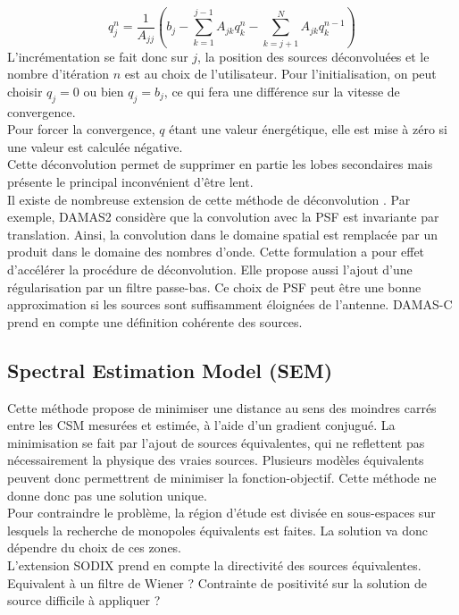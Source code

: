 \begin{equation}
	q_j^n= \frac{1}{A_{jj}}\left(b_j -\sum_{k=1}^{j-1}A_{jk}q_k^{n} - \sum_{k=j+1}^{N}A_{jk}q_k^{n-1} \right)
\end{equation}
L'incrémentation se fait donc sur $j$, la position des sources déconvoluées et le nombre d'itération $n$ est au choix de l'utilisateur. Pour l'initialisation, on peut choisir $q_j=0$ ou bien $q_j=b_j$, ce qui fera une différence sur la vitesse de convergence.\\
Pour forcer la convergence, $q$ étant une valeur énergétique, elle est mise à zéro si une valeur est calculée négative.\\
Cette déconvolution permet de supprimer en partie les lobes secondaires mais présente le principal inconvénient d'être lent.\\

Il existe de nombreuse extension de cette méthode de déconvolution \citep{Dougherty2005}. Par exemple, DAMAS2 considère que la convolution avec la PSF est invariante par translation. Ainsi, la convolution dans le domaine spatial est remplacée par un produit dans le domaine des nombres d'onde. Cette formulation a pour effet d'accélérer la procédure de déconvolution. Elle propose aussi l'ajout d'une régularisation par un filtre passe-bas. Ce choix de PSF peut être une bonne approximation si les sources sont suffisamment éloignées de l'antenne. DAMAS-C prend en compte une définition cohérente des sources.%



 
\subsection{Spectral Estimation Model (SEM)}
Cette méthode propose de minimiser une distance au sens des moindres carrés entre les CSM mesurées et estimée, à l'aide d'un gradient conjugué. La minimisation se fait par l'ajout de sources équivalentes, qui ne reflettent pas nécessairement la physique des vraies sources. Plusieurs modèles équivalents peuvent donc permettrent de minimiser la fonction-objectif. Cette méthode ne donne donc pas une solution unique.\\
Pour contraindre le problème, la région d'étude est divisée en sous-espaces sur lesquels la recherche de monopoles équivalents est faites. La solution va donc dépendre du choix de ces zones.
\citep{Blacodon2003}\\
L'extension SODIX prend en compte la directivité des sources équivalentes.
Equivalent à un filtre de Wiener ?
Contrainte de positivité sur la solution de source difficile à appliquer ?




